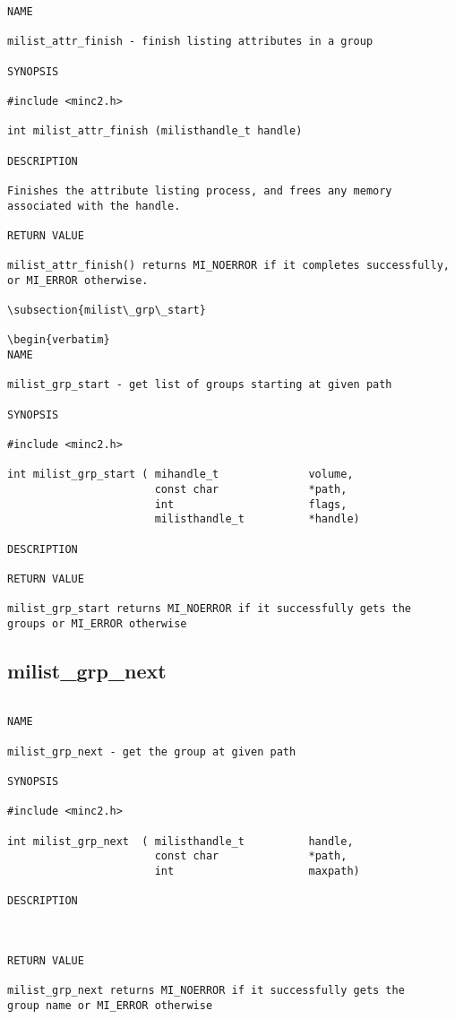 \documentclass{article}
\begin{document}
\begin{verbatim}
NAME

milist_attr_finish - finish listing attributes in a group

SYNOPSIS

#include <minc2.h>

int milist_attr_finish (milisthandle_t handle)

DESCRIPTION

Finishes the attribute listing process, and frees any memory
associated with the handle.

RETURN VALUE 

milist_attr_finish() returns MI_NOERROR if it completes successfully,
or MI_ERROR otherwise.

\subsection{milist\_grp\_start}

\begin{verbatim}
NAME 

milist_grp_start - get list of groups starting at given path

SYNOPSIS

#include <minc2.h>

int milist_grp_start ( mihandle_t              volume, 
                       const char              *path,
                       int                     flags,
                       milisthandle_t          *handle)

DESCRIPTION

RETURN VALUE

milist_grp_start returns MI_NOERROR if it successfully gets the
groups or MI_ERROR otherwise
\end{verbatim}


\subsection{milist\_grp\_next}

\begin{verbatim}

NAME 

milist_grp_next - get the group at given path

SYNOPSIS

#include <minc2.h>

int milist_grp_next  ( milisthandle_t          handle, 
                       const char              *path,
                       int                     maxpath)
                        
DESCRIPTION



RETURN VALUE

milist_grp_next returns MI_NOERROR if it successfully gets the
group name or MI_ERROR otherwise

\end{verbatim}
\end{document}
